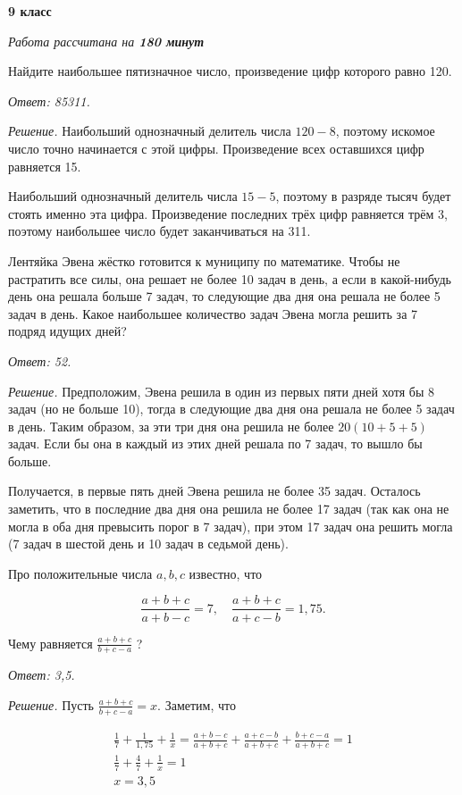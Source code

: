 \centerline{\bf \huge 9 класс}
\centerline{\normalsize{\it Работа рассчитана на \bf{180} минут}}

Найдите наибольшее пятизначное число, произведение цифр которого равно 120.

\textit{Ответ: 85311.}

\textit{Решение.} Наибольший однозначный делитель числа $120-8$, поэтому искомое число точно начинается с этой цифры. Произведение всех оставшихся цифр равняется 15.

Наибольший однозначный делитель числа $15-5$, поэтому в разряде тысяч будет стоять именно эта цифра. Произведение последних трёх цифр равняется трём 3, поэтому наибольшее число будет заканчиваться на 311.

Лентяйка Эвена жёстко готовится к муниципу по математике. Чтобы не растратить все силы, она решает не более 10 задач в день, а если в какой-нибудь день она решала больше 7 задач, то следующие два дня она решала не более 5 задач в день. Какое наибольшее количество задач Эвена могла решить за 7 подряд идущих дней?

\textit{Ответ: 52.}

\textit{Решение.}
Предположим, Эвена решила в один из первых пяти дней хотя бы 8 задач (но не больше 10), тогда в следующие два дня она решала не более 5 задач в день. Таким образом, за эти три дня она решила не более $20(10+5+5)$ задач. Если бы она в каждый из этих дней решала по 7 задач, то вышло бы больше.

Получается, в первые пять дней Эвена решила не более 35 задач. Осталось заметить, что в последние два дня она решила не более 17 задач (так как она не могла в оба дня превысить порог в 7 задач), при этом 17 задач она решить могла (7 задач в шестой день и 10 задач в седьмой день).

Про положительные числа $a, b, c$ известно, что

$$
\frac{a+b+c}{a+b-c}=7, \quad \frac{a+b+c}{a+c-b}=1,75 .
$$


Чему равняется $\frac{a+b+c}{b+c-a}$ ?

\textit{Ответ: 3,5.}

\textit{Решение.}
Пусть $\frac{a+b+c}{b+c-a}=x$. Заметим, что

$$
\begin{gathered}
\frac{1}{7}+\frac{1}{1,75}+\frac{1}{x}=\frac{a+b-c}{a+b+c}+\frac{a+c-b}{a+b+c}+\frac{b+c-a}{a+b+c}=1 \\
\frac{1}{7}+\frac{4}{7}+\frac{1}{x}=1 \\
x=3,5
\end{gathered}
$$


